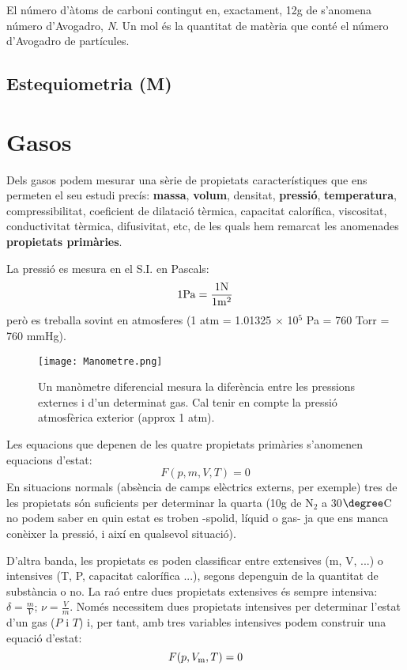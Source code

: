 \begin{mdframed}[backgroundcolor=gray!30,frametitle=Concepte de mol]
El número d'àtoms de carboni contingut en, exactament, 12g de  s'anomena número d'Avogadro, \emph{N}. Un mol és la quantitat de matèria que conté el número d'Avogadro de partícules.
\end{mdframed}

\newpage

\subsection{Estequiometria (M)}

\section{Gasos}
\label{sec:gasos}

Dels gasos podem mesurar una sèrie de propietats característiques que ens permeten el seu estudi precís: \textbf{massa}, \textbf{volum}, densitat, \textbf{pressió}, \textbf{temperatura}, compressibilitat, coeficient de dilatació tèrmica, capacitat calorífica, viscositat, conductivitat tèrmica, difusivitat, etc, de les quals hem remarcat les anomenades \textbf{propietats primàries}.

La pressió es mesura en el S.I. en Pascals:
\[
1 {\rm Pa}=\frac{1 {\rm N}}{1 {\rm m}^2}
\]
però es treballa sovint en atmosferes (1 atm = 1.01325 $\times$ 10$^5$ Pa = 760 Torr = 760 mmHg).
\begin{figure}[h]
\centering
\texttt{[image: Manometre.png]}
\caption[Manòmetre diferencial]{Un manòmetre diferencial mesura la diferència entre les pressions externes i d'un determinat gas. Cal tenir en compte la pressió atmosfèrica exterior (approx 1 atm).}
\label{fig:Manometre}
\end{figure}
Les equacions que depenen de les quatre propietats primàries s'anomenen equacions d'estat:
\[F(p,m,V,T)=0\]
En situacions normals (absència de camps elèctrics externs, per exemple) tres de les propietats són suficients per determinar la quarta (10g de N$_2$ a 30$\degree$C no podem saber en quin estat es troben -spolid, líquid o gas- ja que ens manca conèixer la pressió, i així en qualsevol situació).

D'altra banda, les propietats es poden classificar entre extensives (m, V, ...) o intensives (T, P, capacitat calorífica ...), segons depenguin de la quantitat de substància o no. La raó entre dues propietats extensives és sempre intensiva: $\delta = \frac{m}{V}$; $\nu = \frac{V}{m}$. Només necessitem dues propietats intensives per determinar l'estat d'un gas ($P$ i $T$) i, per tant, amb tres variables intensives podem construir una equació d'estat: 
\[F(p,V_{\rm m},T)=0\]

